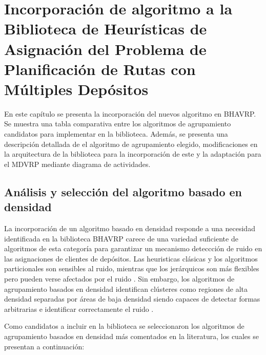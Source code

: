 \chapter{Incorporaci\'on de algoritmo a la Biblioteca de Heur\'isticas de Asignaci\'on del Problema de Planificaci\'on de Rutas con M\'ultiples Dep\'ositos}\label{cap:incorporacion}

En este cap\'itulo se presenta la incorporaci\'on del nuevos algoritmo en BHAVRP. Se muestra una tabla comparativa entre los algoritmos de agrupamiento candidatos para implementar en la biblioteca. Adem\'as, se presenta una descripci\'on detallada de el algoritmo de agrupamiento elegido, modificaciones en la arquitectura de la biblioteca para la incorporaci\'on de este y la adaptaci\'on para el MDVRP mediante diagrama de actividades.

\section{Análisis y selección del algoritmo basado en densidad}

La incorporación de un algoritmo basado en densidad responde a una necesidad identificada en  la biblioteca BHAVRP carece de una variedad suficiente de algoritmos de esta categoría para garantizar un mecanismo deteccción de ruido en las asignaciones de clientes de depósitos. Las heuristicas clásicas y los algoritmos particionales son sensibles al ruido, mientras que los jerárquicos son más flexibles pero pueden verse afectados por el ruido \parencite{jainAlgorithmsClusteringData1988}. Sin embargo, los algoritmos de agrupamiento basados en densidad identifican clústeres como regiones de alta densidad separadas por áreas de baja densidad siendo capaces de detectar formas arbitrarias e identificar correctamente el ruido \parencite{esterDensitybasedAlgorithmDiscovering1996}.

Como candidatos a incluir en la biblioteca se seleccionaron los algoritmos de agrupamiento basados en densidad más comentados en la literatura, los cuales se presentan a continuación:

